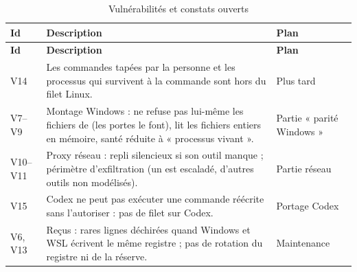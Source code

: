 {\small
\begin{longtable}{@{}L{1.8cm}L{8.2cm}L{4.6cm}@{}}
\caption{Vulnérabilités et constats ouverts}\label{tab:v-ouvertes}\\
\toprule
\textbf{Id} & \textbf{Description} & \textbf{Plan} \\
\midrule
\endfirsthead
\toprule
\textbf{Id} & \textbf{Description} & \textbf{Plan} \\
\midrule
\endhead
\bottomrule
\endfoot
V14 & Les commandes tapées par la personne et les processus qui survivent à la commande sont
  hors du filet Linux. & Plus tard \\
V7--V9 & Montage Windows : ne refuse pas lui-même les fichiers de \demo{} (les portes le
  font), lit les fichiers entiers en mémoire, santé réduite à « processus vivant ». & Partie
  « parité Windows » \\
V10--V11 & Proxy réseau : repli silencieux si son outil manque ; périmètre d'exfiltration
  (un  est escaladé, d'autres outils non modélisés). & Partie réseau \\
V15 & Codex ne peut pas exécuter une commande réécrite sans l'autoriser : pas de filet sur
  Codex. & Portage Codex \\
V6, V13 & Reçus : rares lignes déchirées quand Windows et WSL écrivent le même registre ; pas de
  rotation du registre ni de la réserve. & Maintenance \\
\end{longtable}
}
